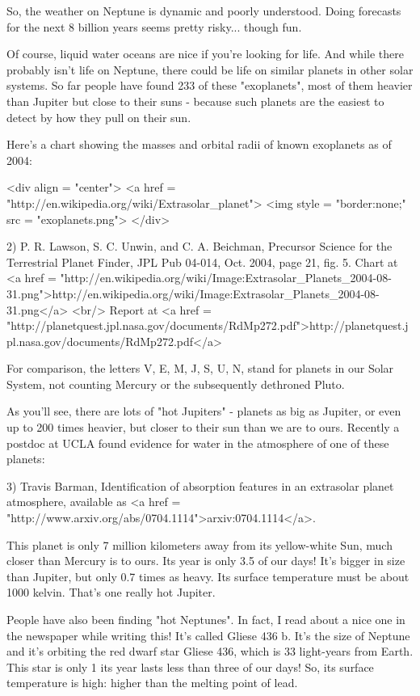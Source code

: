 So, the weather on Neptune is dynamic and poorly understood.  Doing 
forecasts for the next 8 billion years seems pretty risky... though fun. 

Of course, liquid water oceans are nice if you're looking for life.
And while there probably isn't life on Neptune, there could be life on 
similar planets in other solar systems.  So far people have found 233
of these "exoplanets", most of them heavier than Jupiter but close 
to their suns - because such planets are the easiest to detect by how 
they pull on their sun.  

Here's a chart showing the masses and orbital radii of known exoplanets 
as of 2004:

<div align = "center">
<a href = "http://en.wikipedia.org/wiki/Extrasolar_planet">
<img style = "border:none;" src = "exoplanets.png">
</div>

2) P. R. Lawson, S. C. Unwin, and C. A. Beichman, Precursor Science for
the Terrestrial Planet Finder, JPL Pub 04-014, Oct. 2004, page 21, fig. 5.
Chart at <a href = "http://en.wikipedia.org/wiki/Image:Extrasolar_Planets_2004-08-31.png">http://en.wikipedia.org/wiki/Image:Extrasolar_Planets_2004-08-31.png</a> <br/>
Report at <a href = "http://planetquest.jpl.nasa.gov/documents/RdMp272.pdf">http://planetquest.jpl.nasa.gov/documents/RdMp272.pdf</a>

For comparison, the letters V, E, M, J, S, U, N, stand for planets in 
our Solar System, not counting Mercury or the subsequently dethroned 
Pluto.  

As you'll see, there are lots of "hot Jupiters" - planets as big as 
Jupiter, or even up to 200 times heavier, but closer to their sun than 
we are to ours.  Recently a postdoc at UCLA found evidence for water 
in the atmosphere of one of these planets:

3) Travis Barman, Identification of absorption features in an extrasolar 
planet atmosphere, available as <a href = "http://www.arxiv.org/abs/0704.1114">arxiv:0704.1114</a>.

This planet is only 7 million kilometers away from its yellow-white Sun, 
much closer than Mercury is to ours.  Its year is only 3.5 of our days!  
It's bigger in size than Jupiter, but only 0.7 times as heavy.  Its 
surface temperature must be about 1000 kelvin.  That's one really hot
Jupiter.

People have also been finding "hot Neptunes".  In fact, I
read about a nice one in the newspaper while writing this!  It's
called Gliese 436 b.  It's the size of Neptune and it's orbiting the
red dwarf star Gliese 436, which is 33 light-years from Earth.  This
star is only 1%
its year lasts less than three of our days!  So, its surface
temperature is high: higher than the melting point of lead.

